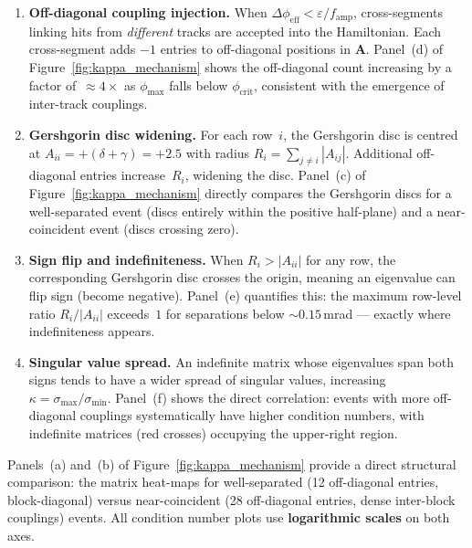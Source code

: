 \documentclass[12pt,a4paper]{article}
\begin{document}
\begin{enumerate}
  \item \textbf{Off-diagonal coupling injection.}
    When $\Delta\phi_\text{eff} < \varepsilon / f_\text{amp}$,
    cross-segments linking hits from \emph{different} tracks are accepted
    into the Hamiltonian.  Each cross-segment adds $-1$ entries to
    off-diagonal positions in $\mathbf{A}$.
    Panel~(d) of Figure~\ref{fig:kappa_mechanism} shows the off-diagonal
    count increasing by a factor of~$\approx\!4\times$ as $\phi_\text{max}$
    falls below $\phi_\text{crit}$, consistent with the emergence of
    inter-track couplings.

  \item \textbf{Gershgorin disc widening.}
    For each row~$i$, the Gershgorin disc is centred at
    $A_{ii} = +(\delta+\gamma) = +2.5$ with radius
    $R_i = \sum_{j\neq i}|A_{ij}|$.
    Additional off-diagonal entries increase~$R_i$, widening the disc.
    Panel~(c) of Figure~\ref{fig:kappa_mechanism} directly compares the
    Gershgorin discs for a well-separated event (discs entirely within the
    positive half-plane) and a near-coincident event (discs crossing zero).

  \item \textbf{Sign flip and indefiniteness.}
    When $R_i > |A_{ii}|$ for any row, the corresponding Gershgorin disc
    crosses the origin, meaning an eigenvalue can flip sign (become negative).
    Panel~(e) quantifies this: the maximum row-level ratio
    $R_i / |A_{ii}|$ exceeds~$1$ for separations below
    $\sim\!0.15$\,mrad — exactly where indefiniteness appears.

  \item \textbf{Singular value spread.}
    An indefinite matrix whose eigenvalues span both signs tends to have
    a wider spread of singular values, increasing
    $\kappa = \sigma_\text{max}/\sigma_\text{min}$.
    Panel~(f) shows the direct correlation: events with more off-diagonal
    couplings systematically have higher condition numbers,
    with indefinite matrices (red crosses) occupying the upper-right region.
\end{enumerate}

\noindent Panels~(a) and~(b) of Figure~\ref{fig:kappa_mechanism} provide
a direct structural comparison: the matrix heat-maps for well-separated
(12 off-diagonal entries, block-diagonal) versus near-coincident
(28 off-diagonal entries, dense inter-block couplings) events.
All condition number plots use \textbf{logarithmic scales} on both axes.
\end{document}
